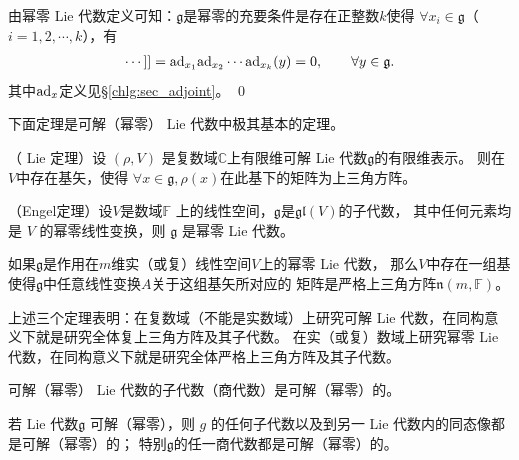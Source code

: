 \begin{example}
    由幂零 Lie 代数定义可知：$\mathfrak{g}$是幂零的充要条件是存在正整数$k$使得
    $\forall x_i\in \mathfrak{g}$（$i=1,2,\cdots,k$），有
    \begin{align*}
        [x_1,[x_2,\cdots, [{x_k},y]\cdots ]]
        ={\rm ad}_{x_1} {\rm ad}_{x_2}\cdots {\rm ad}_{x_k} (y) =0 ,
        \qquad \forall y\in \mathfrak{g} .
    \end{align*}
    其中${\rm ad}_{x}$定义见\S \ref{chlg:sec_adjoint}。 \qed
\end{example}


下面定理是可解（幂零） Lie 代数中极其基本的定理。


\begin{theorem}\label{chlg:thm_Lie}
    （ Lie 定理）设 $(\rho, V)$ 是复数域$\mathbb{C}$上有限维可解 Lie 代数$\mathfrak{g}$的有限维表示。
    则在$V$中存在基矢，使得 $\forall x \in \mathfrak{g}, \rho(x)$在此基下的矩阵为上三角方阵。
\end{theorem}


\begin{theorem}\label{chlg:thm_Engel}
    （Engel定理）设$V$是数域$\mathbb{F}$ 上的线性空间，$\mathfrak{g}$是$\mathfrak{gl}(V)$的子代数，
    其中任何元素均是 $V$ 的幂零线性变换，则 $\mathfrak{g}$ 是幂零 Lie 代数。
\end{theorem}


\begin{theorem}
    如果$\mathfrak{g}$是作用在$m$维实（或复）线性空间$V$上的幂零 Lie 代数，
    那么$V$中存在一组基使得$\mathfrak{g}$中任意线性变换$A$关于这组基矢所对应的
    矩阵是严格上三角方阵$\mathfrak{n}(m,\mathbb{F})$。
\end{theorem}

上述三个定理表明：在复数域（不能是实数域）上研究可解 Lie 代数，在同构意义下就是研究全体复上三角方阵及其子代数。
在实（或复）数域上研究幂零 Lie 代数，在同构意义下就是研究全体严格上三角方阵及其子代数。




\begin{proposition}
    可解（幂零） Lie 代数的子代数（商代数）是可解（幂零）的。
\end{proposition}

\begin{proposition}
    若 Lie 代数$\mathfrak{g}$ 可解（幂零），则 $g$ 的任何子代数以及到另一 Lie 代数内的同态像都是可解（幂零）的；
    特别$\mathfrak{g}$的任一商代数都是可解（幂零）的。
\end{proposition}

